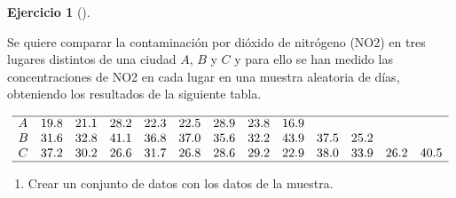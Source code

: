 \documentclass[
  a4paper,
]{scrreport}
\theoremstyle{definition}
\newtheorem{exercise}{Ejercicio}[chapter]
\theoremstyle{remark}
\begin{document}
\begin{exercise}[]\protect\hypertarget{exr-anova-un-factor-contaminacion}{}\label{exr-anova-un-factor-contaminacion}

Se quiere comparar la contaminación por dióxido de nitrógeno (NO2) en
tres lugares distintos de una ciudad \(A\), \(B\) y \(C\) y para ello se
han medido las concentraciones de NO2 en cada lugar en una muestra
aleatoria de días, obteniendo los resultados de la siguiente tabla.

\[
\begin{array}{lrrrrrrrrrrrr}
\hline
A & 19.8 & 21.1 & 28.2 & 22.3 & 22.5 & 28.9 & 23.8 & 16.9 \\
B & 31.6 & 32.8 & 41.1 & 36.8 & 37.0 & 35.6 & 32.2 & 43.9 & 37.5 & 25.2 \\
C & 37.2 & 30.2 & 26.6 & 31.7 & 26.8 & 28.6 & 29.2 & 22.9 & 38.0 & 33.9 & 26.2 & 40.5 \\
\hline
\end{array}
\]

\begin{enumerate}
\def\labelenumi{\alph{enumi}.}
\item
  Crear un conjunto de datos con los datos de la muestra.

  \begin{tcolorbox}[enhanced jigsaw, coltitle=black, left=2mm, colback=white, leftrule=.75mm, toptitle=1mm, breakable, bottomrule=.15mm, titlerule=0mm, bottomtitle=1mm, title=\textcolor{quarto-callout-tip-color}{\faLightbulb}\hspace{0.5em}{Solución}, arc=.35mm, toprule=.15mm, rightrule=.15mm, colframe=quarto-callout-tip-color-frame, opacityback=0, colbacktitle=quarto-callout-tip-color!10!white, opacitybacktitle=0.6]


\end{tcolorbox}
\end{enumerate}
\end{exercise}
\end{document}
